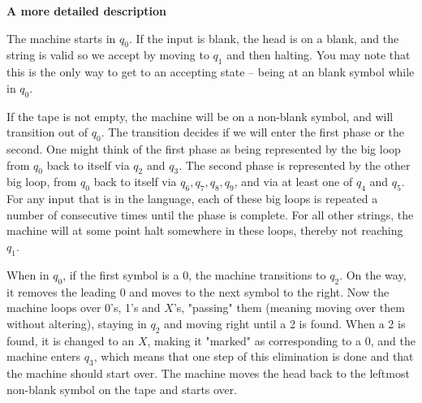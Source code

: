 \documentclass{article}
\begin{document}
\begin{enumerate}[(a)]
        \textbf{A more detailed description}

        The machine starts in $q_0$. If the input is blank, the head is on a blank, and the string is valid so we accept by moving to $q_1$ and then halting. You may note that this is the only way to get to an accepting state – being at an blank symbol while in $q_0$. 
        
        If the tape is not empty, the machine will be on a non-blank symbol, and will transition out of $q_0$. The transition decides if we will enter the first phase or the second. One might think of the first phase as being represented by the big loop from $q_0$ back to itself via $q_2$ and $q_3$. The second phase is represented by the other big loop, from $q_0$ back to itself via $q_6,q_7,q_8,q_9$, and via at least one of $q_4$ and $q_5$. For any input that is in the language, each of these big loops is repeated a number of consecutive times until the phase is complete. For all other strings, the machine will at some point halt somewhere in these loops, thereby not reaching $q_1$.

        When in $q_0$, if the first symbol is a 0, the machine transitions to $q_2$. On the way, it removes the leading 0 and moves to the next symbol to the right. Now the machine loops over 0's, 1's and $X$'s, "passing" them (meaning moving over them without altering), staying in $q_2$ and moving right until a 2 is found. When  a 2 is found, it is changed to an $X$, making it "marked" as corresponding to a 0, and the machine enters $q_3$, which means that one step of this elimination is done and that the machine should start over. The machine moves the head back to the leftmost non-blank symbol on the tape and starts over.


\end{enumerate}
\end{document}
